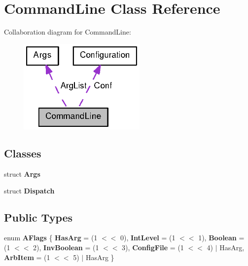 \section{\-Command\-Line \-Class \-Reference}
\label{classCommandLine}


\-Collaboration diagram for \-Command\-Line\-:
\nopagebreak
\begin{figure}[H]
\begin{center}
\leavevmode
\includegraphics[width=176pt]{classCommandLine__coll__graph}
\end{center}
\end{figure}
\subsection*{\-Classes}
\begin{DoxyCompactItemize}
\item 
struct {\bf \-Args}
\item 
struct {\bf \-Dispatch}
\end{DoxyCompactItemize}
\subsection*{\-Public \-Types}
\begin{DoxyCompactItemize}
\item 
enum {\bfseries \-A\-Flags} \{ \*
{\bfseries \-Has\-Arg} =  (1 $<$$<$ 0), 
{\bfseries \-Int\-Level} =  (1 $<$$<$ 1), 
{\bfseries \-Boolean} =  (1 $<$$<$ 2), 
{\bfseries \-Inv\-Boolean} =  (1 $<$$<$ 3), 
\*
{\bfseries \-Config\-File} =  (1 $<$$<$ 4) $|$ \-Has\-Arg, 
{\bfseries \-Arb\-Item} =  (1 $<$$<$ 5) $|$ \-Has\-Arg
 \}
\end{DoxyCompactItemize}

